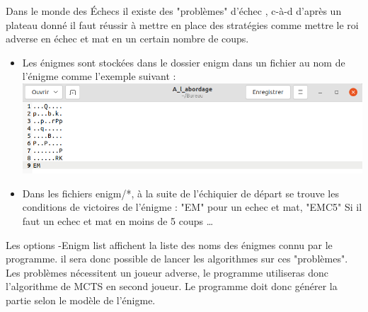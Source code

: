 \documentclass{article}
\begin{document}
\begin{itemize}
    \newline
        Dans le monde des Échecs il existe des "problèmes" d'échec \cite{Krt}, c-à-d d'après un plateau donné il faut réussir à mettre en place des stratégies comme mettre le roi adverse en échec et mat en un certain nombre de coups.\newline
        \begin{itemize}
            \item Les énigmes sont stockées dans le dossier enigm dans un fichier au nom de l'énigme comme l'exemple suivant : \newline
            \includegraphics[scale = 0.3]{img/a_l_abordage.png}
            \item Dans les fichiers enigm/*, à la suite de l'échiquier de départ se trouve les conditions de victoires de l'énigme : "EM" pour un echec et mat, "EMC5" Si il faut un echec et mat en moins de 5 coups \dots
        \end{itemize}
        Les options -Enigm list affichent la liste des noms des énigmes connu par le programme.
        il sera donc possible de lancer les algorithmes sur ces "problèmes".
        Les problèmes nécessitent un joueur adverse, le programme utiliseras donc l'algorithme de MCTS en second joueur.
        Le programme doit donc générer la partie selon le modèle de l'énigme.
\end{itemize}
\end{document}
